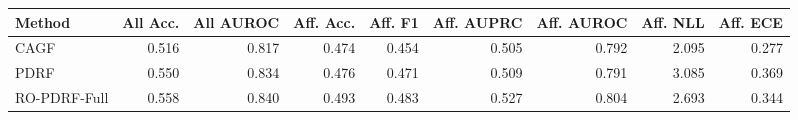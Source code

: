 \begin{tabular}{lrrrrrrrr}
\toprule
Method & All Acc. & All AUROC & Aff. Acc. & Aff. F1 & Aff. AUPRC & Aff. AUROC & Aff. NLL & Aff. ECE \\
\midrule
CAGF & 0.516 & 0.817 & 0.474 & 0.454 & 0.505 & 0.792 & 2.095 & 0.277 \\
PDRF & 0.550 & 0.834 & 0.476 & 0.471 & 0.509 & 0.791 & 3.085 & 0.369 \\
RO-PDRF-Full & 0.558 & 0.840 & 0.493 & 0.483 & 0.527 & 0.804 & 2.693 & 0.344 \\
\bottomrule
\end{tabular}